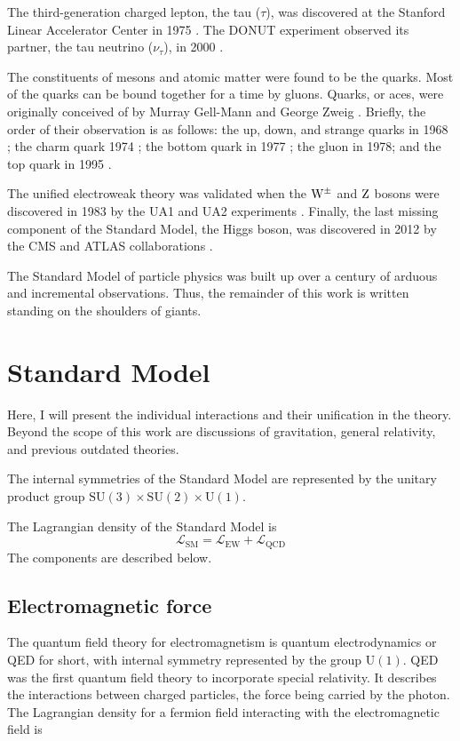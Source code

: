 The third-generation charged lepton, the tau ($\tau$), was discovered at the Stanford Linear Accelerator Center in 1975 \cite{Perl1975}.
The DONUT experiment observed its partner, the tau neutrino ($\nu_\tau$), in 2000 \cite{Donut2001}.

The constituents of mesons and atomic matter were found to be the quarks.
Most of the quarks can be bound together for a time by gluons. 
Quarks, or aces, were originally conceived of by Murray Gell-Mann \cite{GellMann:1964nj} and George Zweig \cite{Zweig:570209}.
Briefly, the order of their observation is as follows: 
the up, down, and strange quarks in 1968 \cite{PhysRevLett.23.930} \cite{PhysRevLett.23.935};
the charm quark 1974 \cite{Ting1974} \cite{Richter1974};
the bottom quark in 1977 \cite{Lederman1977};
the gluon in 1978; \cite{Stella2011}
and the top quark in 1995 \cite{CDFTop1995} \cite{D0Top1995}.

The unified electroweak theory was validated when the $\mathrm{W}^\pm$ and $\mathrm{Z}$ bosons 
were discovered in 1983 by the UA1 and UA2 experiments 
\cite{Arnison:1983mk} \cite{Arnison:1983rp} \cite{Bagnaia:1983zx} \cite{Banner:1983jy}. 
Finally, the last missing component of the Standard Model, the Higgs boson, was discovered in 2012 by the CMS and ATLAS collaborations \cite{Chatrchyan:2012xdj} \cite{Aad:2012tfa}.

The Standard Model of particle physics was built up over a century of arduous and incremental observations. Thus, the remainder of this work is written standing on the shoulders of giants.

\section{Standard Model}
Here, I will present the individual interactions and their unification in the theory.
Beyond the scope of this work are discussions of gravitation, general relativity, and
previous outdated theories.

The internal symmetries of the Standard Model are represented by the unitary product group 
$\mathrm{SU}(3) \times \mathrm{SU}(2) \times \mathrm{U}(1)$.

The Lagrangian density of the Standard Model is
\begin{equation}
\mathcal{L}_\mathrm{SM} = \mathcal{L}_\mathrm{EW} + \mathcal{L}_\mathrm{QCD}
\end{equation}
The components are described below.

\subsection{Electromagnetic force}
\label{qed}
The quantum field theory for electromagnetism is quantum electrodynamics or QED for short,
with internal symmetry represented by the group $\mathrm{U}(1)$. 
QED was the first quantum field theory to incorporate special relativity. 
It describes the interactions between charged particles, the force being carried by the photon.
The Lagrangian density for a fermion field interacting with the electromagnetic field is


